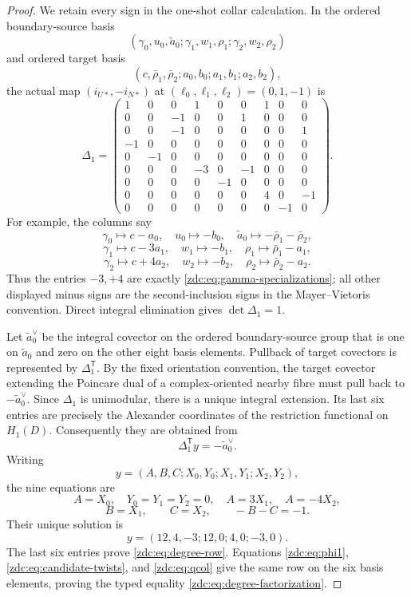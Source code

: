 \begin{proof}
We retain every sign in the one-shot collar calculation.  In the ordered
boundary-source basis
\[
 (\gamma_0,u_0,\widetilde a_0;
   \gamma_1,w_1,\rho_1;
   \gamma_2,w_2,\rho_2)
\]
and ordered target basis
\[
 (c,\bar\rho_1,\bar\rho_2;
   a_0,b_0;a_1,b_1;a_2,b_2),
\]
the actual map $(i_{U*},-i_{N*})$ at
\(\left(\ell_0,\ell_1,\ell_2\right)=(0,1,-1)\) is
\begin{equation}
 \Delta_1=
 \begin{pmatrix}
 1&0&0&1&0&0&1&0&0\\
 0&0&-1&0&0&1&0&0&0\\
 0&0&-1&0&0&0&0&0&1\\
 -1&0&0&0&0&0&0&0&0\\
 0&-1&0&0&0&0&0&0&0\\
 0&0&0&-3&0&-1&0&0&0\\
 0&0&0&0&-1&0&0&0&0\\
 0&0&0&0&0&0&4&0&-1\\
 0&0&0&0&0&0&0&-1&0
 \end{pmatrix}.
 \label{zdc:eq:collar-matrix}
\end{equation}
For example, the columns say
\[
 \gamma_0\mapsto c-a_0,\quad u_0\mapsto-b_0,\quad
 \widetilde a_0\mapsto-\bar\rho_1-\bar\rho_2,
\]
\[
 \gamma_1\mapsto c-3a_1,\quad w_1\mapsto-b_1,\quad
 \rho_1\mapsto\bar\rho_1-a_1,
\]
\[
 \gamma_2\mapsto c+4a_2,\quad w_2\mapsto-b_2,\quad
 \rho_2\mapsto\bar\rho_2-a_2.
\]
Thus the entries $-3,+4$ are exactly
\eqref{zdc:eq:gamma-specializations}; all other displayed minus signs are
the second-inclusion signs in the Mayer--Vietoris convention.  Direct
integral elimination gives $\det\Delta_1=1$.

Let $\widetilde a_0^\vee$ be the integral covector on the ordered
boundary-source group that is one on $\widetilde a_0$ and zero on the other
eight basis elements.  Pullback of target covectors is represented by
$\Delta_1^{\mathsf T}$.  By the fixed orientation convention, the target
covector extending the Poincare dual of a complex-oriented nearby fibre
must pull back to $-\widetilde a_0^\vee$.  Since $\Delta_1$ is unimodular,
there is a unique integral extension.  Its last six entries are precisely
the Alexander coordinates of the restriction functional on $H_1(D)$.
Consequently they are obtained from
\begin{equation}
 \Delta_1^{\mathsf T}y=-\widetilde a_0^\vee.
 \label{zdc:eq:transpose-system}
\end{equation}
Writing
\[
 y=(A,B,C;X_0,Y_0;X_1,Y_1;X_2,Y_2),
\]
the nine equations are
\[
 A=X_0,\quad Y_0=Y_1=Y_2=0,\quad
 A=3X_1,\quad A=-4X_2,
\]
\[
 B=X_1,\qquad C=X_2,\qquad -B-C=-1.
\]
Their unique solution is
\[
 y=(12,4,-3;12,0;4,0;-3,0).
\]
The last six entries prove \eqref{zdc:eq:degree-row}.  Equations
\eqref{zdc:eq:phi1}, \eqref{zdc:eq:candidate-twists}, and
\eqref{zdc:eq:qcol} give the same row on the six basis elements, proving
the typed equality \eqref{zdc:eq:degree-factorization}.


\end{proof}
